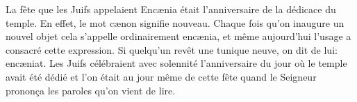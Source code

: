 La fête que les Juifs appelaient Encænia
	était l’anniversaire de la dédicace du temple.
En effet, le mot cænon signifie nouveau.
Chaque fois qu’on inaugure un nouvel objet
	cela s’appelle ordinairement encænia,
	et même aujourd’hui l’usage a consacré cette expression.
Si quelqu’un revêt une tunique neuve, on dit de lui: encæniat.
Les Juifs célébraient avec solennité
	l’anniversaire du jour où le temple avait été dédié
	et l’on était au jour même de cette fête
	quand le Seigneur prononça les paroles qu’on vient de lire.
